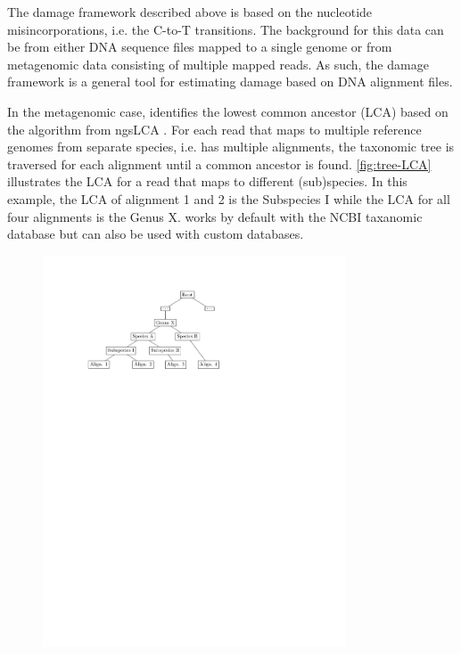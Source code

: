 The damage framework described above is based on the nucleotide misincorporations, i.e. the C-to-T transitions. The background for this data can be from either DNA sequence files mapped to a single genome or from metagenomic data consisting of multiple mapped reads. As such, the damage framework is a general tool for estimating damage based on DNA alignment files.

In the metagenomic case, \metaDMG identifies the lowest common ancestor (LCA) based on the algorithm from ngsLCA \autocite{wangNgsLCAToolkitFast2022}.
For each read that maps to multiple reference genomes from separate species, i.e. has multiple alignments, the taxonomic tree is traversed for each alignment until a common ancestor is found. \autoref{fig:tree-LCA} illustrates the LCA for a read that maps to different (sub)species. In this example, the LCA of alignment 1 and 2 is the Subspecies I while the LCA for all four alignments is the Genus X. \metaDMG works by default with the NCBI taxanomic database but can also be used with custom databases.

\begin{figure}[htbp]
    \centering
    \includegraphics[trim={3cm 19.5cm 8.5cm 2.3cm}, clip, width=0.8\textwidth]{figures/tree.pdf}
\end{figure}

